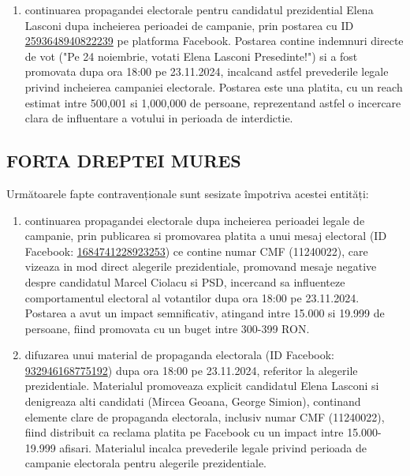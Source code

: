 \documentclass[a4paper,12pt]{article}
\begin{document}
\begin{enumerate}[leftmargin=*, label=\arabic*.)]
    \item continuarea propagandei electorale pentru candidatul prezidential Elena Lasconi dupa incheierea perioadei de campanie, prin postarea cu ID \href{https://www.facebook.com/ads/library/?id=2593648940822239}{2593648940822239} pe platforma Facebook. Postarea contine indemnuri directe de vot ("Pe 24 noiembrie, votati Elena Lasconi Presedinte!") si a fost promovata dupa ora 18:00 pe 23.11.2024, incalcand astfel prevederile legale privind incheierea campaniei electorale. Postarea este una platita, cu un reach estimat intre 500,001 si 1,000,000 de persoane, reprezentand astfel o incercare clara de influentare a votului in perioada de interdictie.
\end{enumerate}

\vspace{0.5cm}

\subsection{FORTA DREPTEI MURES}
Următoarele fapte contravenționale sunt sesizate împotriva acestei entități:

\begin{enumerate}[leftmargin=*, label=\arabic*.)]
    \item continuarea propagandei electorale dupa incheierea perioadei legale de campanie, prin publicarea si promovarea platita a unui mesaj electoral (ID Facebook: \href{https://www.facebook.com/ads/library/?id=1684741228923253}{1684741228923253}) ce contine numar CMF (11240022), care vizeaza in mod direct alegerile prezidentiale, promovand mesaje negative despre candidatul Marcel Ciolacu si PSD, incercand sa influenteze comportamentul electoral al votantilor dupa ora 18:00 pe 23.11.2024. Postarea a avut un impact semnificativ, atingand intre 15.000 si 19.999 de persoane, fiind promovata cu un buget intre 300-399 RON.
    \item difuzarea unui material de propaganda electorala (ID Facebook: \href{https://www.facebook.com/ads/library/?id=932946168775192}{932946168775192}) dupa ora 18:00 pe 23.11.2024, referitor la alegerile prezidentiale. Materialul promoveaza explicit candidatul Elena Lasconi si denigreaza alti candidati (Mircea Geoana, George Simion), continand elemente clare de propaganda electorala, inclusiv numar CMF (11240022), fiind distribuit ca reclama platita pe Facebook cu un impact intre 15.000-19.999 afisari. Materialul incalca prevederile legale privind perioada de campanie electorala pentru alegerile prezidentiale.
\end{enumerate}
\end{document}
